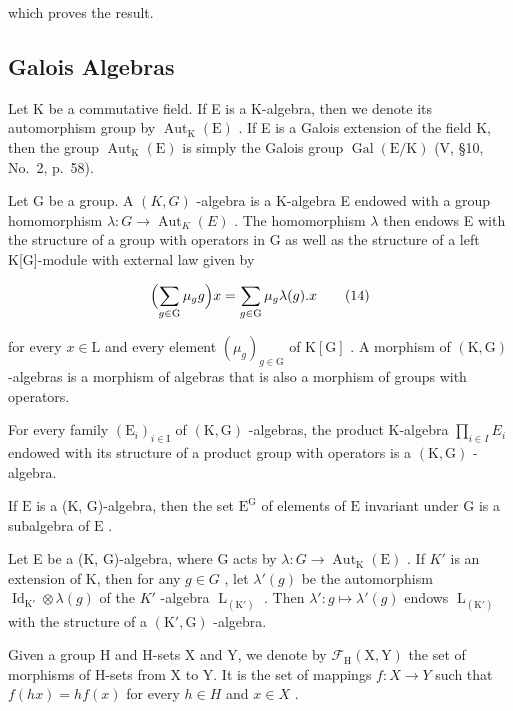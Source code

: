 which proves the result.

\subsection{Galois Algebras}

Let K be a commutative field. If E is a K-algebra, then we denote its automorphism group by \(\operatorname{Aut}_{\mathrm{K}}(\mathrm{E})\) . If E is a Galois extension of the field K, then the group \(\operatorname{Aut}_{\mathrm{K}}(\mathrm{E})\) is simply the Galois group \(\operatorname{Gal}(\mathrm{E}/\mathrm{K})\) (V, §10, No.~2, p.~58).

Let G be a group. A \((K,G)\) -algebra is a K-algebra E endowed with a group homomorphism \(\lambda:G\to\operatorname{Aut}_{K}(E)\) . The homomorphism \(\lambda\) then endows E with the structure of a group with operators in G as well as the structure of a left K{[}G{]}-module with external law given by

\[
\Bigl (\sum_ {g \in \mathrm{G}} \mu_ {g} g \Bigr) x = \sum_ {g \in \mathrm{G}} \mu_ {g} \lambda (g). x\tag{14}
\]

for every \(x \in \mathrm{L}\) and every element \((\mu_g)_{g \in \mathrm{G}}\) of \(\mathrm{K}[\mathrm{G}]\) . A morphism of \((\mathrm{K}, \mathrm{G})\) -algebras is a morphism of algebras that is also a morphism of groups with operators.

For every family \((\mathrm{E}_{i})_{i\in\mathrm{I}}\) of \((\mathrm{K},\mathrm{G})\) -algebras, the product K-algebra \(\prod_{i\in I}E_{i}\) endowed with its structure of a product group with operators is a \((\mathrm{K},\mathrm{G})\) -algebra.

If \(\mathrm{E}\) is a (K, G)-algebra, then the set \(\mathrm{E}^{\mathrm{G}}\) of elements of \(\mathrm{E}\) invariant under \(\mathrm{G}\) is a subalgebra of \(\mathrm{E}\) .

Let E be a (K, G)-algebra, where G acts by \(\lambda: G \to \operatorname{Aut}_{\mathrm{K}}(\mathrm{E})\) . If \(K'\) is an extension of K, then for any \(g \in G\) , let \(\lambda'(g)\) be the automorphism \(\operatorname{Id}_{\mathrm{K}'} \otimes \lambda(g)\) of the \(K'\) -algebra \(\operatorname{L}_{(\mathrm{K}')}\) . Then \(\lambda': g \mapsto \lambda'(g)\) endows \(\operatorname{L}_{(\mathrm{K}')}\) with the structure of a \((\mathrm{K}', \mathrm{G})\) -algebra.

Given a group H and H-sets X and Y, we denote by \(\mathcal{F}_{\mathrm{H}}(\mathrm{X},\mathrm{Y})\) the set of morphisms of H-sets from X to Y. It is the set of mappings \(f:X\to Y\) such that \(f(hx)=hf(x)\) for every \(h\in H\) and \(x\in X\) .

